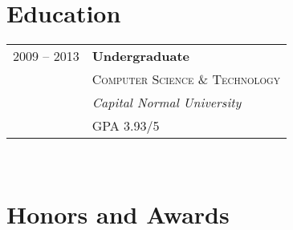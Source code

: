 \documentclass[10pt,a4paper]{article} %
\begin{document}
\begin{minipage}[t]{0.44\textwidth}
\vspace{0pt} %


\section{Education}

\begin{tabular}{rl} %


2009 -- 2013 & \textbf{Undergraduate} \\
& \textsc{Computer Science \& Technology} \\
& \textit{Capital Normal University}\\
& GPA 3.93/5 \\


\end{tabular}\\[0pt]


\section{Honors and Awards}

\begin{tabular}{rl}


\end{tabular}
\end{minipage}
\end{document}

